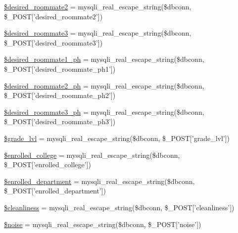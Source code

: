 \begin{DoxyCompactItemize}
\item 
\hyperlink{admin__view_2validate_2studentVal_8php_aeaab2ccbd0e9359193a66a1c07606bf8}{\$desired\-\_\-roommate2} = mysqli\-\_\-real\-\_\-escape\-\_\-string(\$dbconn, \$\-\_\-\-P\-O\-S\-T\mbox{[}'desired\-\_\-roommate2'\mbox{]})
\item 
\hyperlink{admin__view_2validate_2studentVal_8php_a6c6068b6183d30d97211b0acc4c44e97}{\$desired\-\_\-roommate3} = mysqli\-\_\-real\-\_\-escape\-\_\-string(\$dbconn, \$\-\_\-\-P\-O\-S\-T\mbox{[}'desired\-\_\-roommate3'\mbox{]})
\item 
\hyperlink{admin__view_2validate_2studentVal_8php_a5982e6f9a315f1a035bc2b440b67f187}{\$desired\-\_\-roommate1\-\_\-ph} = mysqli\-\_\-real\-\_\-escape\-\_\-string(\$dbconn, \$\-\_\-\-P\-O\-S\-T\mbox{[}'desired\-\_\-roommate\-\_\-ph1'\mbox{]})
\item 
\hyperlink{admin__view_2validate_2studentVal_8php_ac9a221d01a865e9db4fd8d517db1f5f1}{\$desired\-\_\-roommate2\-\_\-ph} = mysqli\-\_\-real\-\_\-escape\-\_\-string(\$dbconn, \$\-\_\-\-P\-O\-S\-T\mbox{[}'desired\-\_\-roommate\-\_\-ph2'\mbox{]})
\item 
\hyperlink{admin__view_2validate_2studentVal_8php_a0e28d9f5935e6f64d0b142410bb2e5e6}{\$desired\-\_\-roommate3\-\_\-ph} = mysqli\-\_\-real\-\_\-escape\-\_\-string(\$dbconn, \$\-\_\-\-P\-O\-S\-T\mbox{[}'desired\-\_\-roommate\-\_\-ph3'\mbox{]})
\item 
\hyperlink{admin__view_2validate_2studentVal_8php_a379014f2a48154febd53d5f95871dc14}{\$grade\-\_\-lvl} = mysqli\-\_\-real\-\_\-escape\-\_\-string(\$dbconn, \$\-\_\-\-P\-O\-S\-T\mbox{[}'grade\-\_\-lvl'\mbox{]})
\item 
\hyperlink{admin__view_2validate_2studentVal_8php_a4918f9ca4d470ccadff836850844ea58}{\$enrolled\-\_\-college} = mysqli\-\_\-real\-\_\-escape\-\_\-string(\$dbconn, \$\-\_\-\-P\-O\-S\-T\mbox{[}'enrolled\-\_\-college'\mbox{]})
\item 
\hyperlink{admin__view_2validate_2studentVal_8php_a2c21a55b0bd902797539f840b7bf94dc}{\$enrolled\-\_\-department} = mysqli\-\_\-real\-\_\-escape\-\_\-string(\$dbconn, \$\-\_\-\-P\-O\-S\-T\mbox{[}'enrolled\-\_\-department'\mbox{]})
\item 
\hyperlink{admin__view_2validate_2studentVal_8php_a7a259082f57125b6bd143f3387a5f655}{\$cleanliness} = mysqli\-\_\-real\-\_\-escape\-\_\-string(\$dbconn, \$\-\_\-\-P\-O\-S\-T\mbox{[}'cleanliness'\mbox{]})
\item 
\hyperlink{admin__view_2validate_2studentVal_8php_a2774f17621ab4d3b64411f86c88df407}{\$noise} = mysqli\-\_\-real\-\_\-escape\-\_\-string(\$dbconn, \$\-\_\-\-P\-O\-S\-T\mbox{[}'noise'\mbox{]})

\end{DoxyCompactItemize}
